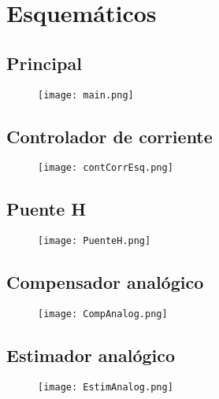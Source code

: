 \section{Esquemáticos}

\subsection{Principal}
\begin{figure}[H]
	\centering
	\texttt{[image: main.png]}
	\label{fig:main}
\end{figure}

\subsection{Controlador de corriente}
\begin{figure}[H]
	\centering
	\texttt{[image: contCorrEsq.png]}
	\label{fig:contCorrEsq}
\end{figure}

\subsection{Puente H}
\begin{figure}[H]
	\centering
	\texttt{[image: PuenteH.png]}
	\label{fig:PuenteH}
\end{figure}

\subsection{Compensador analógico}
\begin{figure}[H]
	\centering
	\texttt{[image: CompAnalog.png]}
	\label{fig:CompAnalog}
\end{figure}

\subsection{Estimador analógico}
\begin{figure}[H]
	\centering
	\texttt{[image: EstimAnalog.png]}
	\label{fig:EstimAnalog}
\end{figure}

